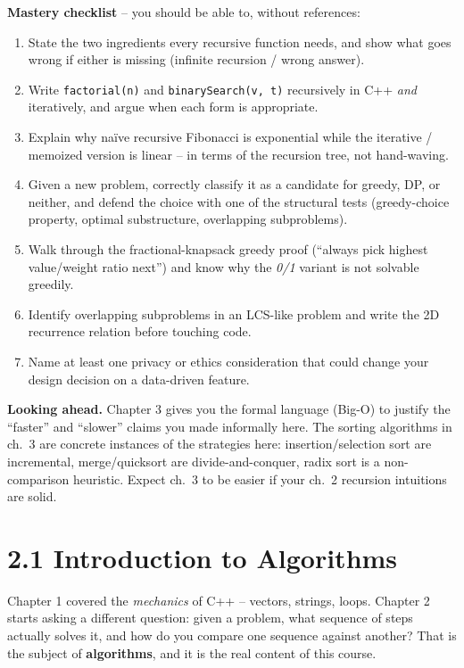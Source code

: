 \documentclass[11pt]{article}
\begin{document}
\begin{ideabox}
\textbf{Mastery checklist} -- you should be able to, without references:
\begin{enumerate}
    \item State the two ingredients every recursive function needs,
          and show what goes wrong if either is missing (infinite
          recursion / wrong answer).
    \item Write \texttt{factorial(n)} and \texttt{binarySearch(v, t)}
          recursively in C++ \emph{and} iteratively, and argue when each
          form is appropriate.
    \item Explain why na\"ive recursive Fibonacci is exponential while
          the iterative / memoized version is linear -- in terms of the
          recursion tree, not hand-waving.
    \item Given a new problem, correctly classify it as a candidate for
          greedy, DP, or neither, and defend the choice with one of the
          structural tests (greedy-choice property, optimal substructure,
          overlapping subproblems).
    \item Walk through the fractional-knapsack greedy proof (``always
          pick highest value/weight ratio next'') and know why the
          \emph{0/1} variant is not solvable greedily.
    \item Identify overlapping subproblems in an LCS-like problem and
          write the 2D recurrence relation before touching code.
    \item Name at least one privacy or ethics consideration that could
          change your design decision on a data-driven feature.
\end{enumerate}

\textbf{Looking ahead.} Chapter 3 gives you the formal language (Big-O)
to justify the ``faster'' and ``slower'' claims you made informally here.
The sorting algorithms in ch.~3 are concrete instances of the strategies
here: insertion/selection sort are incremental, merge/quicksort are
divide-and-conquer, radix sort is a non-comparison heuristic. Expect ch.~3
to be easier if your ch.~2 recursion intuitions are solid.
\end{ideabox}

\section{2.1 Introduction to Algorithms}

Chapter 1 covered the \emph{mechanics} of C++ -- vectors, strings,
loops. Chapter 2 starts asking a different question: given a problem,
what sequence of steps actually solves it, and how do you compare one
sequence against another? That is the subject of \textbf{algorithms},
and it is the real content of this course.
\end{document}
